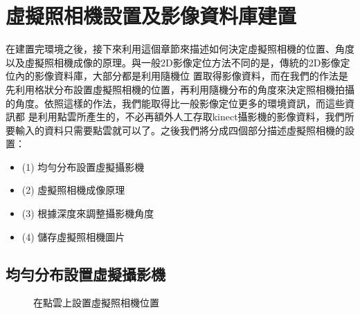 \section{虛擬照相機設置及影像資料庫建置}
	
	在建置完環境之後，接下來利用這個章節來描述如何決定虛擬照相機的位置、角度以及虛擬照相機成像的原理。與一般2D影像定位方法不同的是，傳統的2D影像定位內的影像資料庫，大部分都是利用隨機位
	置取得影像資料，而在我們的作法是先利用格狀分布設置虛擬照相機的位置，再利用隨機分布的角度來決定照相機拍攝的角度。依照這樣的作法，我們能取得比一般影像定位更多的環境資訊，而這些資訊都
	是利用點雲所產生的，不必再額外人工存取kinect攝影機的影像資料，我們所要輸入的資料只需要點雲就可以了。之後我們將分成四個部分描述虛擬照相機的設置：
	
	\begin{itemize}
		\item (1) 均勻分布設置虛擬攝影機
    	\item (2) 虛擬照相機成像原理
    	\item (3) 根據深度來調整攝影機角度
    	\item (4) 儲存虛擬照相機圖片
	\end{itemize}  		

\subsection{均勻分布設置虛擬攝影機}
%

	\begin{figure}
		\begin{center}
		\end{center}
	  \caption{在點雲上設置虛擬照相機位置}
	  \label{fig:Virtual Camera Pose}	
	\end{figure}	
	

